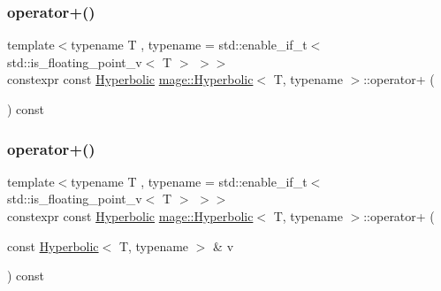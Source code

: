 \subsubsection{\texorpdfstring{operator+()}{operator+()}\hspace{0.1cm}{\footnotesize\ttfamily [1/3]}}
{\footnotesize\ttfamily template$<$typename T , typename  = std\+::enable\+\_\+if\+\_\+t$<$ std\+::is\+\_\+floating\+\_\+point\+\_\+v$<$ T $>$ $>$$>$ \\
constexpr const \mbox{\hyperlink{structmage_1_1_hyperbolic}{Hyperbolic}} \mbox{\hyperlink{structmage_1_1_hyperbolic}{mage\+::\+Hyperbolic}}$<$ T, typename $>$\+::operator+ (\begin{DoxyParamCaption}{ }\end{DoxyParamCaption}) const\hspace{0.3cm}{\ttfamily [noexcept]}}

\mbox{\label{structmage_1_1_hyperbolic_a6da318ff5bbc10ebe9afa53c5ba20e4a}} 
\subsubsection{\texorpdfstring{operator+()}{operator+()}\hspace{0.1cm}{\footnotesize\ttfamily [2/3]}}
{\footnotesize\ttfamily template$<$typename T , typename  = std\+::enable\+\_\+if\+\_\+t$<$ std\+::is\+\_\+floating\+\_\+point\+\_\+v$<$ T $>$ $>$$>$ \\
constexpr const \mbox{\hyperlink{structmage_1_1_hyperbolic}{Hyperbolic}} \mbox{\hyperlink{structmage_1_1_hyperbolic}{mage\+::\+Hyperbolic}}$<$ T, typename $>$\+::operator+ (\begin{DoxyParamCaption}\item[{const \mbox{\hyperlink{structmage_1_1_hyperbolic}{Hyperbolic}}$<$ T, typename $>$ \&}]{v }\end{DoxyParamCaption}) const\hspace{0.3cm}{\ttfamily [noexcept]}}

\mbox{\label{structmage_1_1_hyperbolic_af07bad6751d35e562f8184161ae87c15}} 
